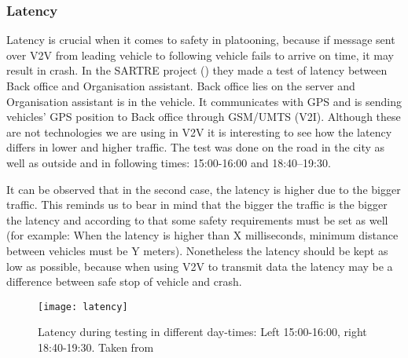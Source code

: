 \subsubsection{Latency}
Latency is crucial when it comes to safety in platooning, because if message sent over V2V from leading vehicle to following vehicle fails to arrive on time, it may result in crash. In the SARTRE project (\cite{Chan2012ProjectSARTRE}) they made a test of latency between Back office and Organisation assistant. Back office lies on the server and Organisation assistant is in the vehicle. It communicates with GPS and is sending vehicles’ GPS position to Back office through GSM/UMTS (V2I). Although these are not technologies we are using in V2V it is interesting to see how the latency differs in lower and higher traffic. The test was done on the road in the city as well as outside and in following times: 15:00-16:00 and 18:40–19:30.\par
% 
It can be observed that in the second case, the latency is higher due to the bigger traffic. This reminds us to bear in mind that the bigger the traffic is the bigger the latency and according to that some safety requirements must be set as well (for example: When the latency is higher than X milliseconds, minimum distance between vehicles must be Y meters). Nonetheless the latency should be kept as low as possible, because when using V2V to transmit data the latency may be a difference between safe stop of vehicle and crash.
% 
\begin{figure}[p]
    \centering
    \texttt{[image: latency]}
    \caption{Latency during testing in different day-times: Left 15:00-16:00, right 18:40-19:30. Taken from \cite[p. 24]{Chan2012ProjectSARTRE}}
    \label{fig:latency}
\end{figure}
% 
